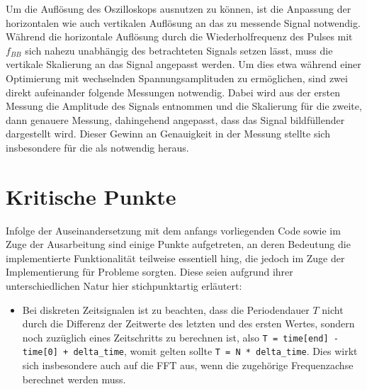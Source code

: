 \documentclass[../Report.tex]{subfiles}
\begin{document}
Um die Auflösung des Oszilloskops ausnutzen zu können, ist die Anpassung der horizontalen wie auch vertikalen Auflösung an das zu messende Signal notwendig.
Während die horizontale Auflösung durch die Wiederholfrequenz des Pulses mit $f_{BB}$ sich nahezu unabhängig des betrachteten Signals setzen lässt, muss die vertikale Skalierung an das Signal angepasst werden. Um dies etwa während einer Optimierung mit wechselnden Spannungsamplituden zu ermöglichen, sind zwei direkt aufeinander folgende Messungen notwendig. Dabei wird aus der ersten Messung die Amplitude des Signals entnommen und die Skalierung für die zweite, dann genauere Messung, dahingehend angepasst, dass das Signal bildfüllender dargestellt wird.
Dieser Gewinn an Genauigkeit in der Messung stellte sich insbesondere für die  als notwendig heraus.


\section{Kritische Punkte}
\label{sec:vorg.critical}

Infolge der Auseinandersetzung mit dem anfangs vorliegenden Code sowie im Zuge der Ausarbeitung sind einige Punkte aufgetreten, an deren Bedeutung die implementierte Funktionalität teilweise essentiell hing, die jedoch im Zuge der Implementierung für Probleme sorgten. Diese seien aufgrund ihrer unterschiedlichen Natur hier stichpunktartig erläutert:
\begin{itemize}
	\item	Bei diskreten Zeitsignalen ist zu beachten, dass die Periodendauer $T$ nicht durch die Differenz der Zeitwerte des letzten und des ersten Wertes, sondern noch zuzüglich eines Zeitschritts  zu berechnen ist, also \lstinline{T = time[end] - time[0] + delta_time}, womit gelten sollte \lstinline{T = N * delta_time}. Dies wirkt sich insbesondere auch auf die FFT aus, wenn die zugehörige Frequenzachse berechnet werden muss.
\end{itemize}
\end{document}
